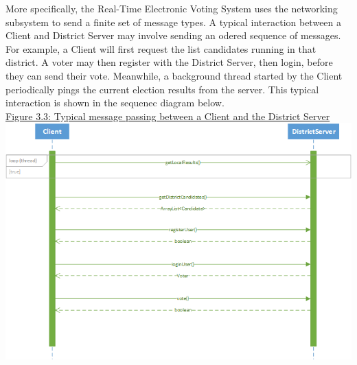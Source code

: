 \documentclass[11pt,english]{article}
\begin{document}
\noindent More specifically, the Real-Time Electronic Voting System uses the networking subsystem to
send a finite set of message types. A typical interaction between a Client and District
Server may involve sending an odered sequence of messages. For example, a Client will
first request the list candidates running in that district. A voter may then
register with the District Server, then login, before they can send their vote.
Meanwhile, a background thread started by the Client periodically pings the current
election results from the server. This typical interaction is shown in the sequenec
diagram below. 
\vspace{10mm} \\
\underline{Figure 3.3: Typical message passing between a Client and the District Server}
\vspace{5mm}\\
\includegraphics[width=7in]{figures/MSC.png}
\end{document}
